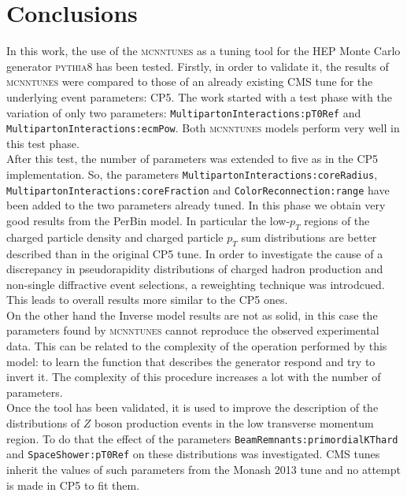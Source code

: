 \chapter*{Conclusions}

In this work, the use of the \textsc{mcnntunes} as a tuning tool for the HEP Monte Carlo generator \textsc{pythia8} has been tested. 
Firstly, in order to validate it, the results of \textsc{mcnntunes} were compared to those of an already existing CMS tune for the underlying event parameters: CP5. The work started with a test phase with the variation of only two parameters: \texttt{Multi}\-\texttt{parton}\-\texttt{Interactions:}\-\texttt{pT0Ref} and \texttt{Multi}\-\texttt{parton}\-\texttt{Interactions:}\-\texttt{ecmPow}. Both \textsc{mcnntunes} models perform very well in this test phase. 
\\
After this test, the number of parameters was extended to five as in the CP5 implementation. So, the parameters \texttt{Multi}\-\texttt{parton}\-\texttt{Interactions:}\-\texttt{core}\-\texttt{Radius}, \texttt{Multi}\-\texttt{parton}\-\texttt{Interactions:}\-\texttt{core}\-\texttt{Fraction} and \texttt{Color}\-\texttt{Reconnection:}\-\texttt{range} have been added to the two parameters already tuned. In this phase we obtain very good results from the PerBin model. In particular the low-$p_T$ regions of the charged particle density and charged particle $p_T$ sum distributions are better described than in the original CP5 tune.  
In order to investigate the cause of a discrepancy in pseudorapidity distributions of charged hadron production and non-single diffractive event selections, a reweighting technique was introdcued.
This leads to overall results more similar to the CP5 ones.
\\
On the other hand the Inverse model results are not as solid, in this case the parameters found by \textsc{mcnntunes} cannot reproduce the observed experimental data.
This can be related to the complexity of the operation performed by this model: to learn the function that describes the generator respond and try to invert it. The complexity of this procedure  increases a lot with the number of parameters.
\\
Once the tool has been validated, it is used to improve the description of the distributions of $Z$ boson production events in the low transverse momentum region. To do that the effect of the parameters \texttt{BeamRemnants:}\-\texttt{primordialKT}\-\texttt{hard} and \texttt{SpaceShower:}\-\texttt{pT0Ref} on these distributions was investigated. CMS tunes inherit the values of such parameters from the Monash 2013  tune and no attempt is made in CP5 to fit them. 
